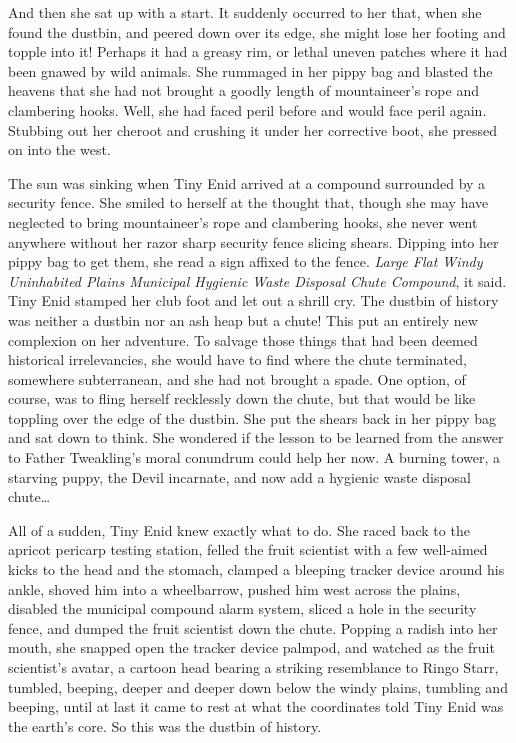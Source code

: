 And then she sat up with a start. It suddenly occurred to her that, when she found the dustbin, and peered down over its edge, she might lose her footing and topple into it! Perhaps it had a greasy rim, or lethal uneven patches where it had been gnawed by wild animals. She rummaged in her pippy bag and blasted the heavens that she had not brought a goodly length of mountaineer's rope and clambering hooks. Well, she had faced peril before and would face peril again. Stubbing out her cheroot and crushing it under her corrective boot, she pressed on into the west.

The sun was sinking when Tiny Enid arrived at a compound surrounded by a security fence. She smiled to herself at the thought that, though she may have neglected to bring mountaineer's rope and clambering hooks, she never went anywhere without her razor sharp security fence slicing shears. Dipping into her pippy bag to get them, she read a sign affixed to the fence. \emph{Large Flat Windy Uninhabited Plains Municipal Hygienic Waste Disposal Chute Compound}, it said. Tiny Enid stamped her club foot and let out a shrill cry. The dustbin of history was neither a dustbin nor an ash heap but a chute! This put an entirely new complexion on her adventure. To salvage those things that had been deemed historical irrelevancies, she would have to find where the chute terminated, somewhere subterranean, and she had not brought a spade. One option, of course, was to fling herself recklessly down the chute, but that would be like toppling over the edge of the dustbin. She put the shears back in her pippy bag and sat down to think. She wondered if the lesson to be learned from the answer to Father Tweakling's moral conundrum could help her now. A burning tower, a starving puppy, the Devil incarnate, and now add a hygienic waste disposal chute\ldots

All of a sudden, Tiny Enid knew exactly what to do. She raced back to the apricot pericarp testing station, felled the fruit scientist with a few well-aimed kicks to the head and the stomach, clamped a bleeping tracker device around his ankle, shoved him into a wheelbarrow, pushed him west across the plains, disabled the municipal compound alarm system, sliced a hole in the security fence, and dumped the fruit scientist down the chute. Popping a radish into her mouth, she snapped open the tracker device palmpod, and watched as the fruit scientist's avatar, a cartoon head bearing a striking resemblance to Ringo Starr, tumbled, beeping, deeper and deeper down below the windy plains, tumbling and beeping, until at last it came to rest at what the coordinates told Tiny Enid was the earth's core. So this was the dustbin of history.

